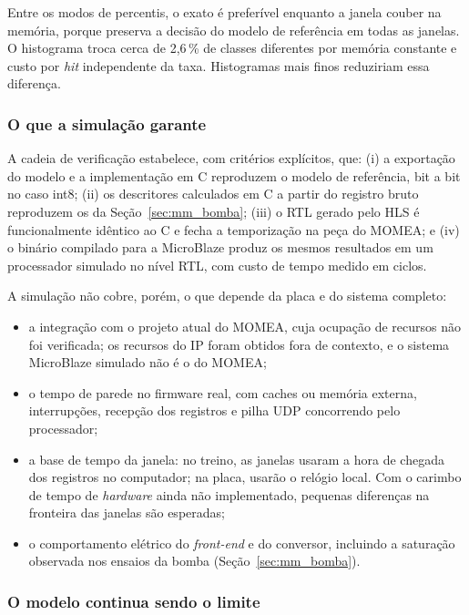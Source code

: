 Entre os modos de percentis, o exato é preferível enquanto a janela couber na memória, porque preserva a decisão do modelo de referência em todas as janelas. O histograma troca cerca de 2,6\,\% de classes diferentes por memória constante e custo por \textit{hit} independente da taxa. Histogramas mais finos reduziriam essa diferença.

\subsubsection{O que a simulação garante}

A cadeia de verificação estabelece, com critérios explícitos, que: (i) a exportação do modelo e a implementação em C reproduzem o modelo de referência, bit a bit no caso int8; (ii) os descritores calculados em C a partir do registro bruto reproduzem os da Seção~\ref{sec:mm_bomba}; (iii) o RTL gerado pelo HLS é funcionalmente idêntico ao C e fecha a temporização na peça do MOMEA; e (iv) o binário compilado para a MicroBlaze produz os mesmos resultados em um processador simulado no nível RTL, com custo de tempo medido em ciclos.

A simulação não cobre, porém, o que depende da placa e do sistema completo:
\begin{itemize}
	\item a integração com o projeto atual do MOMEA, cuja ocupação de recursos não foi verificada; os recursos do IP foram obtidos fora de contexto, e o sistema MicroBlaze simulado não é o do MOMEA;
	\item o tempo de parede no firmware real, com caches ou memória externa, interrupções, recepção dos registros e pilha UDP concorrendo pelo processador;
	\item a base de tempo da janela: no treino, as janelas usaram a hora de chegada dos registros no computador; na placa, usarão o relógio local. Com o carimbo de tempo de \textit{hardware} ainda não implementado, pequenas diferenças na fronteira das janelas são esperadas;
	\item o comportamento elétrico do \textit{front-end} e do conversor, incluindo a saturação observada nos ensaios da bomba (Seção~\ref{sec:mm_bomba}).
\end{itemize}

\subsubsection{O modelo continua sendo o limite}

